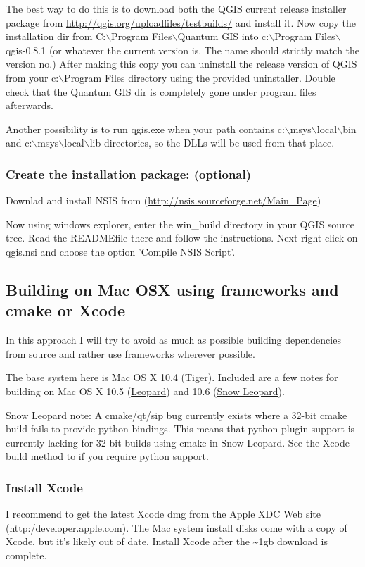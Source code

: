 The best way to do this is to download both the QGIS current release installer
package from \url{http://qgis.org/uploadfiles/testbuilds/} and install it. Now copy
the installation dir from C:$\backslash$Program Files$\backslash$Quantum GIS into c:$\backslash$Program
Files$\backslash$qgis-0.8.1 (or whatever the current version is. The name should strictly
match the version no.) After making this copy you can uninstall the release
version of QGIS from your c:$\backslash$Program Files directory using the provided
uninstaller. Double check that the Quantum GIS dir is completely gone under
program files afterwards.

Another possibility is to run qgis.exe when your path contains
c:$\backslash$msys$\backslash$local$\backslash$bin and c:$\backslash$msys$\backslash$local$\backslash$lib directories, so the DLLs will be
used from that place.

\hypertarget{toc21}{}
\subsubsection{Create the installation package: (optional)}
Downlad and install NSIS from (\url{http://nsis.sourceforge.net/Main\_Page})

Now using windows explorer, enter the win\_build directory in your QGIS source
tree. Read the READMEfile there and follow the instructions. Next right click
on qgis.nsi and choose the option 'Compile NSIS Script'. 


\hypertarget{toc22}{}
\subsection{Building on Mac OSX using frameworks and cmake or Xcode}
In this approach I will try to avoid as much as possible building dependencies
from source and rather use frameworks wherever possible.

The base system here is Mac OS X 10.4 (\underline{Tiger}). Included are a few notes
for building on Mac OS X 10.5 (\underline{Leopard}) and 10.6 (\underline{Snow Leopard}). 

\underline{Snow Leopard note:} A cmake/qt/sip bug currently exists where a 32-bit
cmake build fails to provide python bindings. This means that python plugin support
is currently lacking for 32-bit builds using cmake in Snow Leopard. See the Xcode
build method to if you require python support.

\hypertarget{toc23}{}
\subsubsection{Install Xcode}
I recommend to get the latest Xcode dmg from the Apple XDC Web site 
(http:/developer.apple.com). The Mac system install disks come with a copy of
Xcode, but it's likely out of date.
Install Xcode after the \~{}1gb download is complete.

